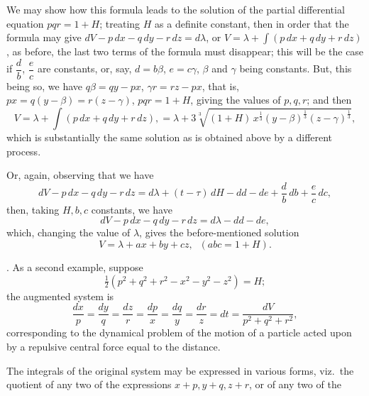 \documentclass[11pt,a4paper]{article}
\begin{document}
We may show how this formula leads to the solution of the partial differential equation $pqr = 1 + H$; treating $H$ as a definite constant, then in order that the formula may give $dV - p\,dx - q\,dy - r\,dz = d\lambda$, or $V = \lambda + \int (p\,dx + q\,dy + r\,dz)$, as before, the last two terms of the formula must disappear; this will be the case if $\dfrac{d}{b}$, $\dfrac{e}{c}$ are constants, or, say, $d = b\beta$, $e = c\gamma$, $\beta$ and $\gamma$ being constants. But, this being so, we have $q\beta = qy - px$, $\gamma r = rz - px$, that is, $px = q(y - \beta) = r(z - \gamma)$, $pqr = 1 + H$, giving the values of $p, q, r$; and then
\[
V = \lambda + \int (p\,dx + q\,dy + r\,dz), = \lambda + 3\sqrt[3]{(1 + H)\,x^{\frac{1}{3}}(y - \beta)^{\frac{1}{3}}(z - \gamma)^{\frac{1}{3}}},
\]
which is substantially the same solution as is obtained above by a different process.

Or, again, observing that we have
\[
dV - p\,dx - q\,dy - r\,dz = d\lambda + (t - \tau)\,dH - dd - de + \frac{d}{b}\,db + \frac{e}{c}\,dc,
\]
then, taking $H, b, c$ constants, we have
\[
dV - p\,dx - q\,dy - r\,dz = d\lambda - dd - de,
\]
which, changing the value of $\lambda$, gives the before-mentioned solution
\[
V = \lambda + ax + by + cz, \;\; (abc = 1 + H).
\]

\medskip

. As a second example, suppose
\[
\tfrac{1}{2}(p^{2} + q^{2} + r^{2} - x^{2} - y^{2} - z^{2}) = H;
\]
the augmented system is
\[
\frac{dx}{p} = \frac{dy}{q} = \frac{dz}{r} = \frac{dp}{x} = \frac{dq}{y} = \frac{dr}{z} = dt = \frac{dV}{p^{2} + q^{2} + r^{2}},
\]
corresponding to the dynamical problem of the motion of a particle acted upon by a repulsive central force equal to the distance.

The integrals of the original system may be expressed in various forms, viz.\ the quotient of any two of the expressions $x + p, y + q, z + r$, or of any two of the

\newpage

\end{document}
